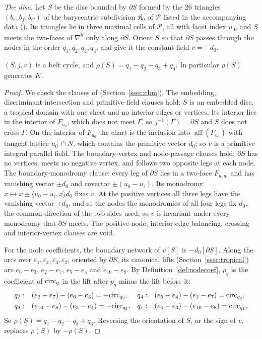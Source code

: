 \emph{The disc.} Let $S$ be the disc bounded by $\partial S$ formed by the $26$ triangles $(b_e,b_f,b_C)$ of the
barycentric subdivision $\mathfrak K_0$ of $\mathscr P$ listed in the accompanying data (\coderepo). Its triangles lie in three maximal
cells of $\mathscr P$, all with facet index $u_0$, and $S$ meets the two-faces of $\nabla^{\check h}$ only along
$\partial S$. Orient $S$ so that $\partial S$ passes through the nodes in the order $q_1,q_2,q_4,q_3$, and give it the
constant field $v=-d_0$.

\begin{lemma}\label{lem:x9belt}
$(S,j,v)$ is a belt cycle, and $\rho(S)=q_1-q_2-q_3+q_4$. In particular $\rho(S)$ generates $K$.
\end{lemma}

\begin{proof}
We check the clauses of \cite[Def.~7.2]{CBM} (Section~\ref{ssec:cbm}). The embedding, discriminant-intersection and primitive-field clauses hold: $S$ is an embedded disc, a
tropical domain with one sheet and no interior edges or vertices. Its interior lies in the interior of $F_{u_0}$, which
does not meet $\Gamma$, so $j^{-1}(\Gamma)=\partial S$ and $S$ does not cross $\Gamma$. On the interior of $F_{u_0}$ the chart
is the inclusion into $\operatorname{aff}(F_{u_0})$ with tangent lattice $u_0^\perp\cap N$, which contains the primitive
vector $d_0$; so $v$ is a primitive integral parallel field. The boundary-vertex and node-passage clauses hold: $\partial S$ has no vertices, meets no
negative vertex, and follows two opposite legs at each node. The boundary-monodromy clause: every leg of $\partial S$ lies in a two-face
$F_{u_0u_i}$ and has vanishing vector $\pm d_0$ and covector $\pm(u_0-u_i)$. Its monodromy
$x\mapsto x\pm\langle u_0-u_i,x\rangle d_0$ fixes $v$. At the positive vertices all three legs have the vanishing vector
$\pm d_0$, and at the nodes the monodromies of all four legs fix $d_0$, the common direction of the two sides used; so
$v$ is invariant under every monodromy that $\partial S$ meets. The positive-node, interior-edge balancing, crossing and interior-vertex clauses are void.

For the node coefficients, the boundary network of $v[S]$ is $-d_0[\partial S]$. Along the arcs over
$\varepsilon_1,\varepsilon_4,\varepsilon_3,\varepsilon_2$, oriented by $\partial S$, its canonical lifts (Section~\ref{ssec:tropical}) are
$e_6-e_3$, $e_2-e_7$, $e_5-e_4$ and $e_{10}-e_8$. By Definition~\ref{def:nodecoef}, $\rho_q$ is the coefficient of
$\mathrm{circ}_q$ in the lift after $p_q$ minus the lift before it:
\[
\begin{aligned}
q_2:&\quad (e_2-e_7)-(e_6-e_3)=-\mathrm{circ}_{q_2}, & q_4:&\quad (e_5-e_4)-(e_2-e_7)=\mathrm{circ}_{q_4},\\
q_3:&\quad (e_{10}-e_8)-(e_5-e_4)=-\mathrm{circ}_{q_3}, & q_1:&\quad (e_6-e_3)-(e_{10}-e_8)=\mathrm{circ}_{q_1}.
\end{aligned}
\]
So $\rho(S)=q_1-q_2-q_3+q_4$. Reversing the orientation of $S$, or the sign of $v$, replaces $\rho(S)$ by $-\rho(S)$.
\end{proof}

